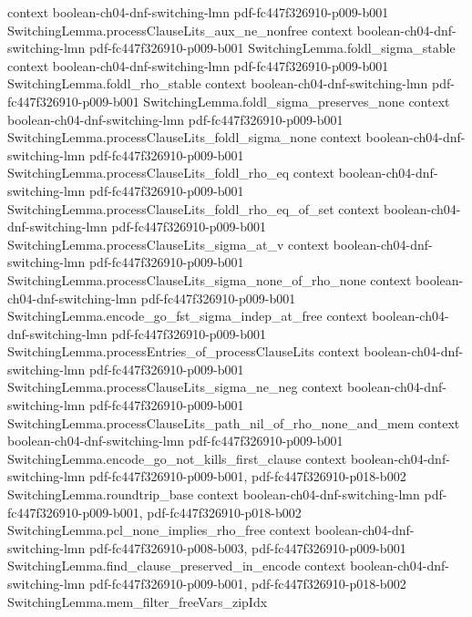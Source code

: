 \begin{lemma}
  {context}
  {boolean-ch04-dnf-switching-lmn}
  {pdf-fc447f326910-p009-b001}
\proofstep
  {SwitchingLemma.processClauseLits_aux_ne_nonfree}
  {context}
  {boolean-ch04-dnf-switching-lmn}
  {pdf-fc447f326910-p009-b001}
\proofstep
  {SwitchingLemma.foldl_sigma_stable}
  {context}
  {boolean-ch04-dnf-switching-lmn}
  {pdf-fc447f326910-p009-b001}
\proofstep
  {SwitchingLemma.foldl_rho_stable}
  {context}
  {boolean-ch04-dnf-switching-lmn}
  {pdf-fc447f326910-p009-b001}
\proofstep
  {SwitchingLemma.foldl_sigma_preserves_none}
  {context}
  {boolean-ch04-dnf-switching-lmn}
  {pdf-fc447f326910-p009-b001}
\proofstep
  {SwitchingLemma.processClauseLits_foldl_sigma_none}
  {context}
  {boolean-ch04-dnf-switching-lmn}
  {pdf-fc447f326910-p009-b001}
\proofstep
  {SwitchingLemma.processClauseLits_foldl_rho_eq}
  {context}
  {boolean-ch04-dnf-switching-lmn}
  {pdf-fc447f326910-p009-b001}
\proofstep
  {SwitchingLemma.processClauseLits_foldl_rho_eq_of_set}
  {context}
  {boolean-ch04-dnf-switching-lmn}
  {pdf-fc447f326910-p009-b001}
\proofstep
  {SwitchingLemma.processClauseLits_sigma_at_v}
  {context}
  {boolean-ch04-dnf-switching-lmn}
  {pdf-fc447f326910-p009-b001}
\proofstep
  {SwitchingLemma.processClauseLits_sigma_none_of_rho_none}
  {context}
  {boolean-ch04-dnf-switching-lmn}
  {pdf-fc447f326910-p009-b001}
\proofstep
  {SwitchingLemma.encode_go_fst_sigma_indep_at_free}
  {context}
  {boolean-ch04-dnf-switching-lmn}
  {pdf-fc447f326910-p009-b001}
\proofstep
  {SwitchingLemma.processEntries_of_processClauseLits}
  {context}
  {boolean-ch04-dnf-switching-lmn}
  {pdf-fc447f326910-p009-b001}
\proofstep
  {SwitchingLemma.processClauseLits_sigma_ne_neg}
  {context}
  {boolean-ch04-dnf-switching-lmn}
  {pdf-fc447f326910-p009-b001}
\proofstep
  {SwitchingLemma.processClauseLits_path_nil_of_rho_none_and_mem}
  {context}
  {boolean-ch04-dnf-switching-lmn}
  {pdf-fc447f326910-p009-b001}
\proofstep
  {SwitchingLemma.encode_go_not_kills_first_clause}
  {context}
  {boolean-ch04-dnf-switching-lmn}
  {pdf-fc447f326910-p009-b001,
    pdf-fc447f326910-p018-b002}
\proofstep
  {SwitchingLemma.roundtrip_base}
  {context}
  {boolean-ch04-dnf-switching-lmn}
  {pdf-fc447f326910-p009-b001,
    pdf-fc447f326910-p018-b002}
\proofstep
  {SwitchingLemma.pcl_none_implies_rho_free}
  {context}
  {boolean-ch04-dnf-switching-lmn}
  {pdf-fc447f326910-p008-b003,
    pdf-fc447f326910-p009-b001}
\proofstep
  {SwitchingLemma.find_clause_preserved_in_encode}
  {context}
  {boolean-ch04-dnf-switching-lmn}
  {pdf-fc447f326910-p009-b001,
    pdf-fc447f326910-p018-b002}
\proofstep
  {SwitchingLemma.mem_filter_freeVars_zipIdx}

\end{lemma}
